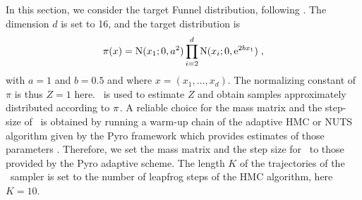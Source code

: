\documentclass{article}
\begin{document}
In this section, we consider the target Funnel distribution, following \cite{jia2020normalizing}.
The dimension $d$ is set to 16, and the target distribution is
\[
\pi(x) = \mathrm{N}(x_1; 0, a^2)\prod_{i=2}^d \mathrm{N}(x_i; 0,\mathrm{e}^{2bx_1})\;,
\]
with $a= 1$ and $b=0.5$ and  where $x=(x_1,\dots, x_d)$. 
 The normalizing constant of $\pi$ is thus $Z=1$ here. \IFIS\ is used to estimate $Z$ and obtain samples approximately distributed according to $\pi$. %
A reliable choice for the mass matrix and the step-size of \InFiNE\ is obtained by running a warm-up chain of the adaptive HMC or NUTS algorithm given by the Pyro framework which provides estimates of those parameters \cite{bingham2019pyro}. %
 Therefore, we set the mass matrix and the step size for \InFiNE\ to those provided by the Pyro adaptive scheme.
The length $K$ of the trajectories of the \IFIS\ sampler is set to the number of leapfrog steps of the HMC algorithm, here $K=10$.
\end{document}
